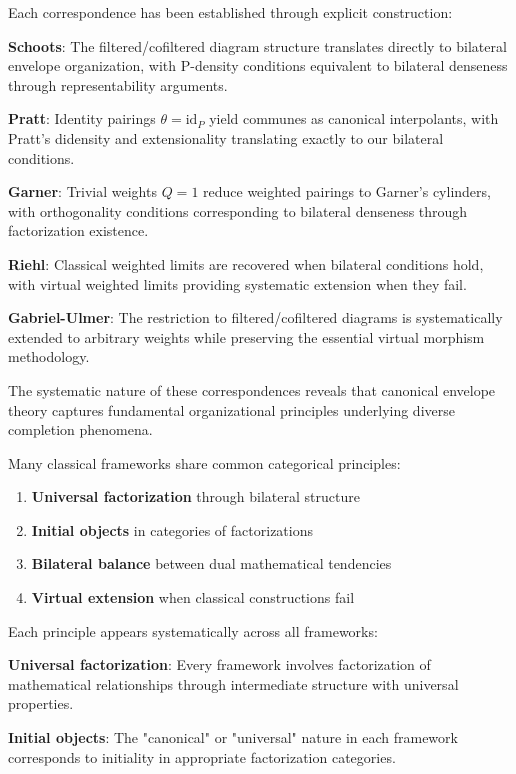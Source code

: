 \documentclass[11pt]{article}
\theoremstyle{plain}
\theoremstyle{definition}
\theoremstyle{remark}
\begin{document}
Each correspondence has been established through explicit construction:

\textbf{Schoots}: The filtered/cofiltered diagram structure translates directly to bilateral envelope organization, with P-density conditions equivalent to bilateral denseness through representability arguments.

\textbf{Pratt}: Identity pairings $\theta = \mathrm{id}_P$ yield communes as canonical interpolants, with Pratt's didensity and extensionality translating exactly to our bilateral conditions.

\textbf{Garner}: Trivial weights $Q = 1$ reduce weighted pairings to Garner's cylinders, with orthogonality conditions corresponding to bilateral denseness through factorization existence.

\textbf{Riehl}: Classical weighted limits are recovered when bilateral conditions hold, with virtual weighted limits providing systematic extension when they fail.

\textbf{Gabriel-Ulmer}: The restriction to filtered/cofiltered diagrams is systematically extended to arbitrary weights while preserving the essential virtual morphism methodology.

The systematic nature of these correspondences reveals that canonical envelope theory captures fundamental organizational principles underlying diverse completion phenomena.

Many classical frameworks share common categorical principles:
\begin{enumerate}
\item \textbf{Universal factorization} through bilateral structure
\item \textbf{Initial objects} in categories of factorizations  
\item \textbf{Bilateral balance} between dual mathematical tendencies
\item \textbf{Virtual extension} when classical constructions fail
\end{enumerate}

Each principle appears systematically across all frameworks:

\textbf{Universal factorization}: Every framework involves factorization of mathematical relationships through intermediate structure with universal properties.

\textbf{Initial objects}: The "canonical" or "universal" nature in each framework corresponds to initiality in appropriate factorization categories.
\end{document}
